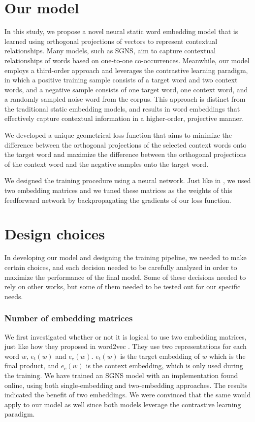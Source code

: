 \section{Our model}
In this study, we propose a novel neural static word embedding model that is learned using orthogonal projections of vectors to represent contextual relationships. Many models, such as \ac{SGNS}, aim to capture contextual relationships of words based on one-to-one co-occurrences. Meanwhile, our model employs a third-order approach and leverages the contrastive learning paradigm, in which a positive training sample consists of a target word and two context words, and a negative sample consists of one target word, one context word, and a randomly sampled noise word from the corpus. This approach is distinct from the traditional static embedding models, and results in word embeddings that effectively capture contextual information in a higher-order, projective manner. 

We developed a unique geometrical loss function that aims to minimize the difference between the orthogonal projections of the selected context words onto the target word and maximize the difference between the orthogonal projections of the context word and the negative samples onto the target word.

We designed the training procedure using a neural network. Just like in \cite{w2v2}, we used two embedding matrices and we tuned these matrices as the weights of this feedforward network by backpropagating the gradients of our loss function.

\section{Design choices}

In developing our model and designing the training pipeline, we needed to make certain choices, and each decision needed to be carefully analyzed in order to maximize the performance of the final model. Some of these decisions needed to rely on other works, but some of them needed to be tested out for our specific needs.

\subsubsection{Number of embedding matrices}

We first investigated whether or not it is logical to use two embedding matrices, just like how they proposed in word2vec \cite{w2v2}. They use two representations for each word $w$, $e_t(w)$ and $e_c(w)$. $e_t(w)$ is the target embedding of $w$ which is the final product, and $e_c(w)$ is the context embedding, which is only used during the training. We have trained an \ac{SGNS} model with an implementation found online, using both single-embedding and two-embedding approaches. The results indicated the benefit of two embeddings. We were convinced that the same would apply to our model as well since both models leverage the contrastive learning paradigm.

